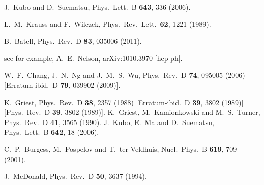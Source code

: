 \documentclass[aps,prd,preprint,nofootinbib]{revtex4}
\begin{document}
\begin{thebibliography}{99}
  J.~Kubo and D.~Suematsu,
  Phys.\ Lett.\  B {\bf 643}, 336 (2006).



  L.~M.~Krauss and F.~Wilczek,
  Phys.\ Rev.\ Lett.\  {\bf 62}, 1221 (1989).

  B.~Batell,
  Phys.\ Rev.\  D {\bf 83}, 035006 (2011).

see for example,
  A.~E.~Nelson,
  arXiv:1010.3970 [hep-ph].

  W.~F.~Chang, J.~N.~Ng and J.~M.~S.~Wu,
  Phys.\ Rev.\  D {\bf 74}, 095005 (2006)
  [Erratum-ibid.\  D {\bf 79}, 039902 (2009)].




  K.~Griest,
  Phys.\ Rev.\  D {\bf 38}, 2357 (1988)
  [Erratum-ibid.\  D {\bf 39}, 3802 (1989)]
  [Phys.\ Rev.\  D {\bf 39}, 3802 (1989)].
    K.~Griest, M.~Kamionkowski and M.~S.~Turner,
  Phys.\ Rev.\  D {\bf 41}, 3565 (1990).
  J.~Kubo, E.~Ma and D.~Suematsu,
  Phys.\ Lett.\  B {\bf 642}, 18 (2006).

  C.~P.~Burgess, M.~Pospelov and T.~ter Veldhuis,
  Nucl.\ Phys.\  B {\bf 619}, 709 (2001).



  J.~McDonald,
  Phys.\ Rev.\  D {\bf 50}, 3637 (1994).




\end{thebibliography}
\end{document}

